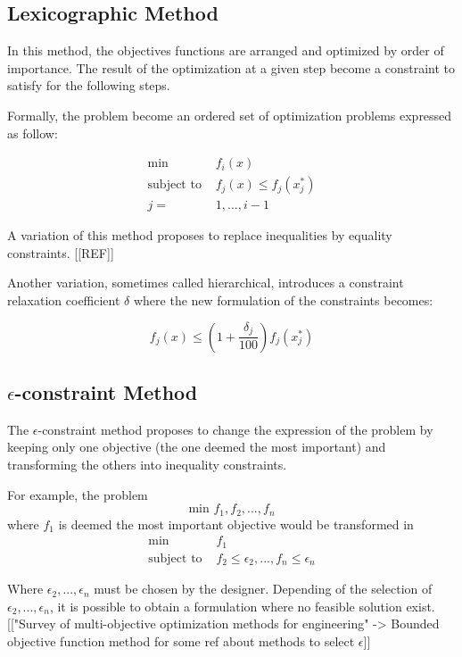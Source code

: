 \subsection{Lexicographic Method}

In this method, the objectives functions are arranged and optimized by order of importance. The result of the optimization at a given step become a constraint to satisfy for the following steps.

Formally, the problem become an ordered set of optimization problems expressed as follow:

\begin{align*}
\text{min } &f_i(x) \\
\text{subject to } &f_j(x) \leq f_j(x_j^*) \\
j = &1, ..., i-1
\end{align*}

A variation of this method proposes to replace inequalities by equality constraints. [[REF]]

Another variation, sometimes called hierarchical, introduces a constraint relaxation coefficient $\delta$ where the new formulation of the constraints becomes:

\[ f_j(x) \leq \left(1 + \frac{\delta_j}{100}\right) f_j(x_j^*) \]

\subsection{$\epsilon$-constraint Method}

The $\epsilon$-constraint method proposes to change the expression of the problem by keeping only one objective (the one deemed the most important) and transforming the others into inequality constraints.

For example, the problem \[\text{min } f_1, f_2, ...,f_n\] where $f_1$ is deemed the most important objective would be transformed in
\begin{align*}
\text{min } &f_1 \\
\text{subject to } &f_2 \leq \epsilon_2, ..., f_n \leq \epsilon_n
\end{align*}

Where $\epsilon_2, ..., \epsilon_n$ must be chosen by the designer.
Depending of the selection of $\epsilon_2, ..., \epsilon_n$, it is possible to obtain a formulation where no feasible solution exist.
[["Survey of multi-objective optimization methods for engineering" -> Bounded objective function method for some ref about methods to select $\epsilon$]]


